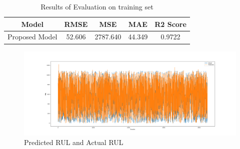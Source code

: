 \documentclass[12pt]{article}
\begin{document}
		\begin{table}[h]
		\centering
		\begin{tabular}{|c|c|c|c|c|}
			\hline
			Model & RMSE & MSE & MAE & R2 Score \\
			\hline
			Proposed Model & 52.606 & 2787.640 & 44.349 &  0.9722 \\
			\hline
		\end{tabular}
		\caption{Results of Evaluation on training set}
		\label{tab:simple_table}
		\end{table}
		
		\begin{figure}[h]
			\centering
			\includegraphics[width=\textwidth]{imgs/predicted.png}
			\caption{Predicted RUL and Actual RUL}
		\end{figure}
		\newpage
\end{document}
